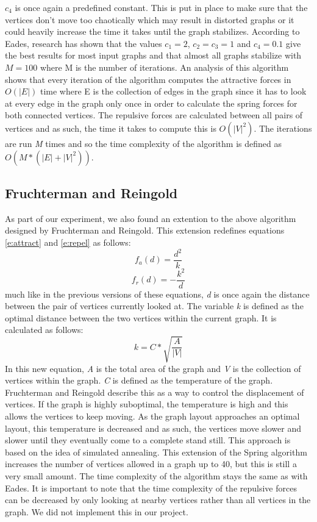 \documentclass[a4paper,12pt,twoside]{article}
\begin{document}
$c_4$ is once again a predefined constant. This is put in place to make sure that the vertices don't move too chaotically which may result in distorted graphs or it could heavily increase the time it takes until the graph stabilizes.
\newline
According to Eades, research has shown that the values $c_1=2$, $c_2=c_3=1$ and $c_4=0.1$ give the best results for most input graphs and that almost all graphs stabilize with $M=100$ where M is the number of iterations.
\newline
An analysis of this algorithm shows that every iteration of the algorithm computes the attractive forces in $O(|E|)$ time where E is the collection of edges in the graph since it has to look at every edge in the graph only once in order to calculate the spring forces for both connected vertices. The repulsive forces are calculated between all pairs of vertices and as such, the time it takes to compute this is $O(|V|^2)$. The iterations are run \emph{M} times and so the time complexity of the algorithm is defined as $O(M*(|E| + |V|^2))$.
\subsection{Fruchterman and Reingold}
As part of our experiment, we also found an extention to the above algorithm designed by Fruchterman and Reingold\cite{FandR}. This extension redefines equations \ref{e:attract} and \ref{e:repel} as follows:
\begin{equation}\label{e:FRattract}
f_a(d)=\frac{d^2}{k}
\end{equation}
\begin{equation}\label{e:FRrepel}
f_r(d)=-\frac{k^2}{d}
\end{equation}
much like in the previous versions of these equations, \emph{d} is once again the distance between the pair of vertices currently looked at. The variable \emph{k} is defined as the optimal distance between the two vertices within the current graph. It is calculated as follows:
\begin{equation}\label{e:optimalD}
k=C*\sqrt{\frac{A}{|V|}}
\end{equation}
In this new equation, \emph{A} is the total area of the graph and \emph{V} is the collection of vertices within the graph. \emph{C} is defined as the temperature of the graph. Fruchterman and Reingold describe this as a way to control the displacement of vertices. If the graph is highly suboptimal, the temperature is high and this allows the vertices to keep moving. As the graph layout approaches an optimal layout, this temperature is decreased and as such, the vertices move slower and slower until they eventually come to a complete stand still. This approach is based on the idea of simulated annealing.
\newline
This extension of the Spring algorithm increases the number of vertices allowed in a graph up to 40, but this is still a very small amount. The time complexity of the algorithm stays the same as with Eades. It is important to note that the time complexity of the repulsive forces can be decreased by only looking at nearby vertices rather than all vertices in the graph. We did not implement this in our project.
\end{document}

